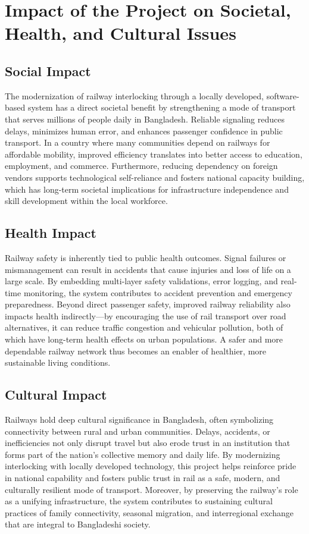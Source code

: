 \section{Impact of the Project on Societal, Health, and Cultural Issues}
\label{sec:outro:social}

\subsection{Social Impact}
The modernization of railway interlocking through a locally developed, software-based system has a direct societal benefit by strengthening a mode of transport that serves millions of people daily in Bangladesh. Reliable signaling reduces delays, minimizes human error, and enhances passenger confidence in public transport. In a country where many communities depend on railways for affordable mobility, improved efficiency translates into better access to education, employment, and commerce. Furthermore, reducing dependency on foreign vendors supports technological self-reliance and fosters national capacity building, which has long-term societal implications for infrastructure independence and skill development within the local workforce.

\subsection{Health Impact}
Railway safety is inherently tied to public health outcomes. Signal failures or mismanagement can result in accidents that cause injuries and loss of life on a large scale. By embedding multi-layer safety validations, error logging, and real-time monitoring, the system contributes to accident prevention and emergency preparedness. Beyond direct passenger safety, improved railway reliability also impacts health indirectly—by encouraging the use of rail transport over road alternatives, it can reduce traffic congestion and vehicular pollution, both of which have long-term health effects on urban populations. A safer and more dependable railway network thus becomes an enabler of healthier, more sustainable living conditions.

\subsection{Cultural Impact}
Railways hold deep cultural significance in Bangladesh, often symbolizing connectivity between rural and urban communities. Delays, accidents, or inefficiencies not only disrupt travel but also erode trust in an institution that forms part of the nation’s collective memory and daily life. By modernizing interlocking with locally developed technology, this project helps reinforce pride in national capability and fosters public trust in rail as a safe, modern, and culturally resilient mode of transport. Moreover, by preserving the railway’s role as a unifying infrastructure, the system contributes to sustaining cultural practices of family connectivity, seasonal migration, and interregional exchange that are integral to Bangladeshi society.